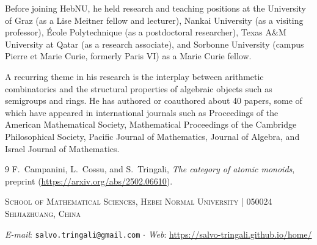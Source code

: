 \documentclass[a4paper,10pt]{amsart}
\begin{document}
Before joining HebNU, he held research and teaching positions at the University 
of Graz (as a Lise Meitner fellow and lecturer), Nankai University (as a visiting 
professor), \'Ecole Polytechnique (as a postdoctoral researcher), Texas A\&M University 
at Qatar (as a research associate), and Sorbonne University (campus Pierre et Marie 
Curie, formerly Paris VI) as a Marie Curie fellow.

A recurring theme in his research is the interplay between arithmetic combinatorics 
and the structural properties of algebraic objects such as semigroups and rings. He 
has authored or coauthored about 40 papers, some of which have appeared in international 
journals such as Proceedings of the American Mathematical Society, Mathematical 
Proceedings of the Cambridge Philosophical Society, Pacific Journal of Mathematics, 
Journal of Algebra, and Israel Journal of Mathematics.


	

\begin{thebibliography}{9}
	F.\ Campanini, L.\ Cossu, and S.\ Tringali, 
	\textit{The category of atomic monoids}, 
	preprint (\url{https://arxiv.org/abs/2502.06610}).
\end{thebibliography}


\vskip 0.5cm                                                                                                                         	


	
{\footnotesize
\textsc{%
	School of Mathematical Sciences, Hebei Normal University | 050024 Shijiazhuang, China}%
}
	

			
	
{\footnotesize%
	\textit{E-mail}: \texttt{salvo.tringali@gmail.com} 
	$\cdot$ 
	\textit{Web}: \url{https://salvo-tringali.github.io/home/}
}
	
\end{document}

